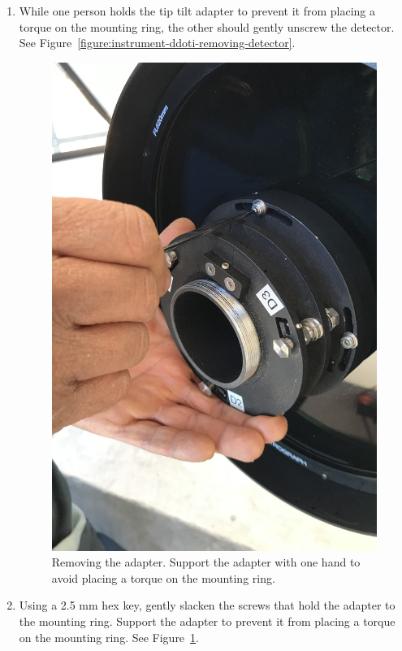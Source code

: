 \begin{enumerate}
\item While one person holds the tip tilt adapter to prevent it from placing a torque on the mounting ring, the other should gently unscrew the detector. See Figure~\ref{figure:instrument-ddoti-removing-detector}.

\begin{figure}
\begin{center}
\includegraphics[height=0.7\linewidth]{figures/instrument-ddoti-removing-adapter.jpg}
\end{center}
\caption{Removing the adapter. Support the adapter with one hand to avoid placing a torque on the mounting ring.}
\label{figure:instrument-ddoti-removing-adapter}
\end{figure}

\item Using a 2.5 mm hex key, gently slacken the screws that hold the adapter to the mounting ring. Support the adapter to prevent it from placing a torque on the mounting ring. See Figure~\ref{figure:instrument-ddoti-removing-adapter}.


\end{enumerate}
